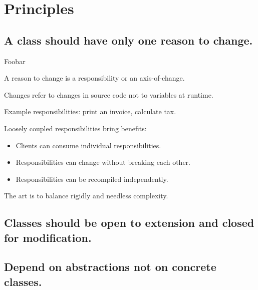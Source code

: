 \documentclass{beamer}
\begin{document}
\section{Principles}

\subsection{A class should have only one reason to change.}

\begin{frame}{Foobar}
    \par A reason to change is a responsibility or an axis-of-change.
    \par Changes refer to changes in source code not to variables at runtime.
    \par Example responsibilities: print an invoice, calculate tax.
    \par Loosely coupled responsibilities bring benefits:
    \begin{itemize}
        \item Clients can consume individual responsibilities.
        \item Responsibilities can change without breaking each other.
        \item Responsibilities can be recompiled independently.
    \end{itemize}
    \par The art is to balance rigidly and needless complexity. 
\end{frame}

\begin{frame}{}
    
\end{frame}

\begin{frame}{}
    
\end{frame}

\subsection{Classes should be open to extension and closed for modification.}

\begin{frame}{}
\end{frame}

\subsection{Depend on abstractions not on concrete classes.}
\end{document}
